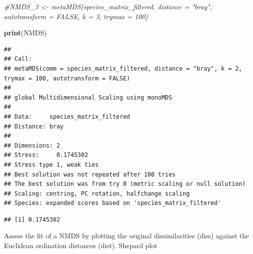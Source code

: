 \documentclass[
]{article}
\newenvironment{Shaded}{\begin{snugshade}}{\end{snugshade}}
\newcommand{\CommentTok}[1]{\textcolor[rgb]{0.56,0.35,0.01}{\textit{#1}}}
\newcommand{\FunctionTok}[1]{\textcolor[rgb]{0.13,0.29,0.53}{\textbf{#1}}}
\newcommand{\NormalTok}[1]{#1}
\newcommand{\SpecialCharTok}[1]{\textcolor[rgb]{0.81,0.36,0.00}{\textbf{#1}}}
\begin{document}
\begin{Shaded}
\begin{Highlighting}[]
\CommentTok{\#NMDS\_3 \textless{}{-} metaMDS(species\_matrix\_filtered, distance = "bray", autotransform = FALSE, k = 3, trymax = 100)}


\FunctionTok{print}\NormalTok{(NMDS)}
\end{Highlighting}
\end{Shaded}

\begin{verbatim}
## 
## Call:
## metaMDS(comm = species_matrix_filtered, distance = "bray", k = 2,      trymax = 100, autotransform = FALSE) 
## 
## global Multidimensional Scaling using monoMDS
## 
## Data:     species_matrix_filtered 
## Distance: bray 
## 
## Dimensions: 2 
## Stress:     0.1745302 
## Stress type 1, weak ties
## Best solution was not repeated after 100 tries
## The best solution was from try 0 (metric scaling or null solution)
## Scaling: centring, PC rotation, halfchange scaling 
## Species: expanded scores based on 'species_matrix_filtered'
\end{verbatim}

\begin{Shaded}
\end{Shaded}

\begin{verbatim}
## [1] 0.1745302
\end{verbatim}

\begin{Shaded}
\end{Shaded}

Assess the fit of a NMDS by plotting the original dissimilarities (diss)
against the Euclidean ordination distances (dist). Shepard plot

\begin{Shaded}
\end{Shaded}
\end{document}
